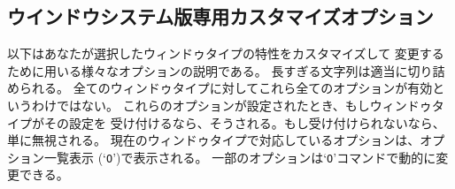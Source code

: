 \subsection*{ウインドウシステム版専用カスタマイズオプション}

以下はあなたが選択したウィンドゥタイプの特性をカスタマイズして
変更するために用いる様々なオプションの説明である。
長すぎる文字列は適当に切り詰められる。
全てのウィンドゥタイプに対してこれら全てのオプションが有効というわけではない。
これらのオプションが設定されたとき、もしウィンドゥタイプがその設定を
受け付けるなら、そうされる。もし受け付けられないなら、単に無視される。
現在のウィンドゥタイプで対応しているオプションは、オプション一覧表示
(`{\tt O}')で表示される。
一部のオプションは`{\tt O}'コマンドで動的に変更できる。


